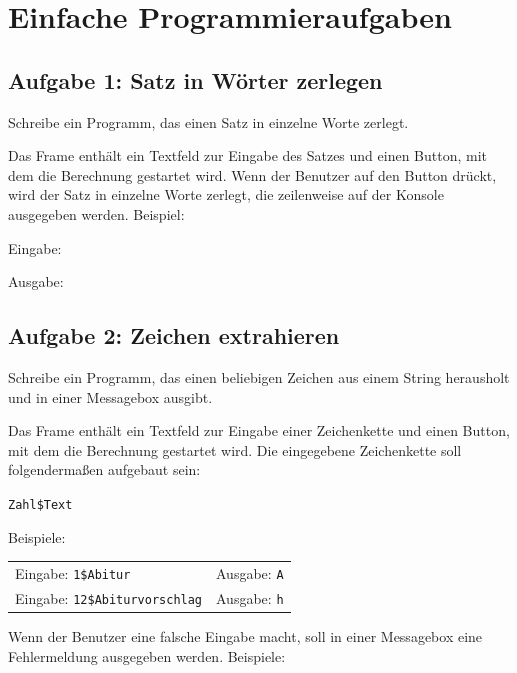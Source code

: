 \section{Einfache Programmieraufgaben}

\subsection{Aufgabe 1: Satz in Wörter zerlegen}

Schreibe ein Programm, das einen Satz in einzelne Worte zerlegt. 

Das Frame enthält ein Textfeld zur Eingabe des Satzes und einen Button, mit dem
die Berechnung gestartet wird. Wenn der Benutzer auf den Button drückt, wird
der Satz in einzelne Worte zerlegt, die zeilenweise auf der Konsole ausgegeben
werden. Beispiel:

Eingabe:


Ausgabe:

\linebreak
{}\linebreak
{}\linebreak 
{}\linebreak 
{}

\subsection{Aufgabe 2: Zeichen extrahieren}

Schreibe ein Programm, das einen beliebigen Zeichen aus einem String
herausholt und in einer Messagebox ausgibt.

Das Frame enthält ein Textfeld zur Eingabe einer Zeichenkette und einen Button,
mit dem die Berechnung gestartet wird. Die eingegebene Zeichenkette soll
folgendermaßen aufgebaut sein:

\lstinline|Zahl$Text|

Beispiele:

\bgroup
\def\arraystretch{1.2}
\begin{tabularx}{\textwidth}{p{50mm} X}
Eingabe: \lstinline|1$Abitur| &
Ausgabe: \lstinline|A| \\
Eingabe: \lstinline|12$Abiturvorschlag| &
Ausgabe: \lstinline|h| \\
\end{tabularx}
\egroup

Wenn der Benutzer eine falsche Eingabe macht, soll in einer Messagebox eine
Fehlermeldung ausgegeben werden. Beispiele:

